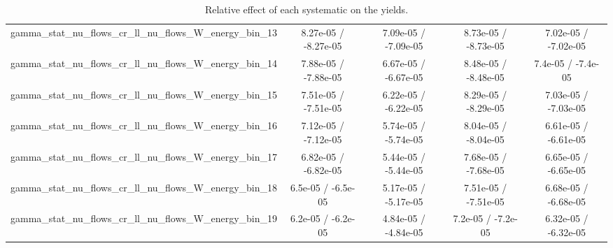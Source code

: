 \documentclass[10pt]{article}
\begin{document}
\begin{table}[htbp]
\begin{center}
\begin{tabular}{|c|c|c|c|c|}
  gamma_stat_nu_flows_cr_ll_nu_flows_W_energy_bin_13 & 8.27e-05 / -8.27e-05 & 7.09e-05 / -7.09e-05 & 8.73e-05 / -8.73e-05 & 7.02e-05 / -7.02e-05 \\ 
  gamma_stat_nu_flows_cr_ll_nu_flows_W_energy_bin_14 & 7.88e-05 / -7.88e-05 & 6.67e-05 / -6.67e-05 & 8.48e-05 / -8.48e-05 & 7.4e-05 / -7.4e-05 \\ 
  gamma_stat_nu_flows_cr_ll_nu_flows_W_energy_bin_15 & 7.51e-05 / -7.51e-05 & 6.22e-05 / -6.22e-05 & 8.29e-05 / -8.29e-05 & 7.03e-05 / -7.03e-05 \\ 
  gamma_stat_nu_flows_cr_ll_nu_flows_W_energy_bin_16 & 7.12e-05 / -7.12e-05 & 5.74e-05 / -5.74e-05 & 8.04e-05 / -8.04e-05 & 6.61e-05 / -6.61e-05 \\ 
  gamma_stat_nu_flows_cr_ll_nu_flows_W_energy_bin_17 & 6.82e-05 / -6.82e-05 & 5.44e-05 / -5.44e-05 & 7.68e-05 / -7.68e-05 & 6.65e-05 / -6.65e-05 \\ 
  gamma_stat_nu_flows_cr_ll_nu_flows_W_energy_bin_18 & 6.5e-05 / -6.5e-05 & 5.17e-05 / -5.17e-05 & 7.51e-05 / -7.51e-05 & 6.68e-05 / -6.68e-05 \\ 
  gamma_stat_nu_flows_cr_ll_nu_flows_W_energy_bin_19 & 6.2e-05 / -6.2e-05 & 4.84e-05 / -4.84e-05 & 7.2e-05 / -7.2e-05 & 6.32e-05 / -6.32e-05 \\ 
\hline 
\end{tabular} 
\caption{Relative effect of each systematic on the yields.} 
\end{center} 
\end{table} 
\end{document}
